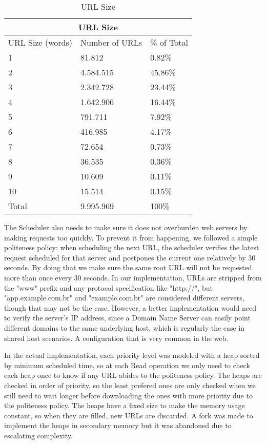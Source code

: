 \documentclass{report}
\begin{document}
\begin{table}
\centering
\begin{tabular}{ |l|l l| }
  \hline
  \multicolumn{3}{|c|}{URL Size} \\
  \hline
  URL Size (words) & Number of URLs & \% of Total \\
  \hline
  1 & 81.812 & 0.82\% \\
  2 & 4.584.515 & 45.86\% \\
  3 & 2.342.728 & 23.44\% \\
  4 & 1.642.906 & 16.44\% \\
  5 & 791.711 & 7.92\% \\
  6 & 416.985 & 4.17\% \\
  7 & 72.654 & 0.73\% \\
  8 & 36.535 & 0.36\% \\
  9 & 10.609 & 0.11\% \\
  10 & 15.514 & 0.15\% \\
  \hline
  Total & 9.995.969 & 100\% \\
  \hline
\end{tabular}
\caption{URL Size}
\label{tab:urlsize}
\end{table}

The Scheduler also needs to make sure it does not overburden web servers by making requests
too quickly. To prevent it from happening, we followed a simple politeness policy:
when scheduling the next URL, the scheduler verifies the latest request scheduled for that server and
postpones the current one relatively by 30 seconds. By doing that we make sure the same root URL will not be requested
more than once every 30 seconds. In our implementation, URLs are stripped from the "www" prefix and
any protocol specification like "http://", but "app.example.com.br" and "example.com.br" are considered
different servers, though that may not be the case. However, a better implementation would need to
verify the server's IP address, since a Domain Name Server can easily point different domains to the 
same underlying host, which is regularly the case in shared host scenarios. A configuration that is
very common in the web.

In the actual implementation, each priority level was modeled with a heap sorted by minimum
scheduled time, so at each Read operation we only need to check each heap once to know if
any URL abides to the politeness policy. The heaps are checked in order of priority, so the least prefered
ones are only checked when we still need to wait longer before downloading the ones with more priority due to
the politeness policy. The heaps have a fixed size to make the memory usage constant, so when they are filled,
new URLs are discarded. A fork was made to implement the heaps in secondary memory but it was abandoned
due to escalating complexity.
\end{document}
